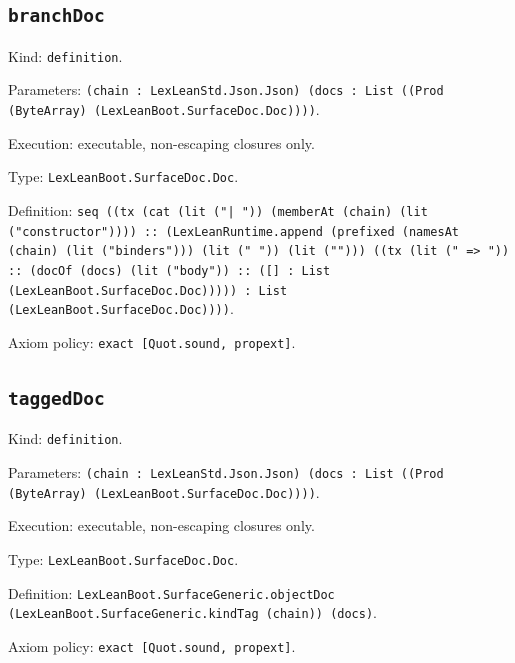 \documentclass[11pt]{article}
\begin{document}
\subsection*{\texttt{branchDoc}}
\noindent Kind: \texttt{definition}.\par
\noindent Parameters: \texttt{(chain : LexLeanStd.Json.Json) (docs : List ((Prod (ByteArray) (LexLeanBoot.SurfaceDoc.Doc))))}.\par
\noindent Execution: executable, non-escaping closures only.\par
\noindent Type: \texttt{LexLeanBoot.SurfaceDoc.Doc}.\par
\noindent Definition: \texttt{seq ((tx (cat (lit ("| ")) (memberAt (chain) (lit ("constructor")))) :: (LexLeanRuntime.append (prefixed (namesAt (chain) (lit ("binders"))) (lit (" ")) (lit (""))) ((tx (lit (" => ")) :: (docOf (docs) (lit ("body")) :: ([] : List (LexLeanBoot.SurfaceDoc.Doc))))) : List (LexLeanBoot.SurfaceDoc.Doc))))}.\par
\noindent Axiom policy: \texttt{exact [Quot.sound, propext]}.\par
\subsection*{\texttt{taggedDoc}}
\noindent Kind: \texttt{definition}.\par
\noindent Parameters: \texttt{(chain : LexLeanStd.Json.Json) (docs : List ((Prod (ByteArray) (LexLeanBoot.SurfaceDoc.Doc))))}.\par
\noindent Execution: executable, non-escaping closures only.\par
\noindent Type: \texttt{LexLeanBoot.SurfaceDoc.Doc}.\par
\noindent Definition: \texttt{LexLeanBoot.SurfaceGeneric.objectDoc (LexLeanBoot.SurfaceGeneric.kindTag (chain)) (docs)}.\par
\noindent Axiom policy: \texttt{exact [Quot.sound, propext]}.\par
\end{document}
